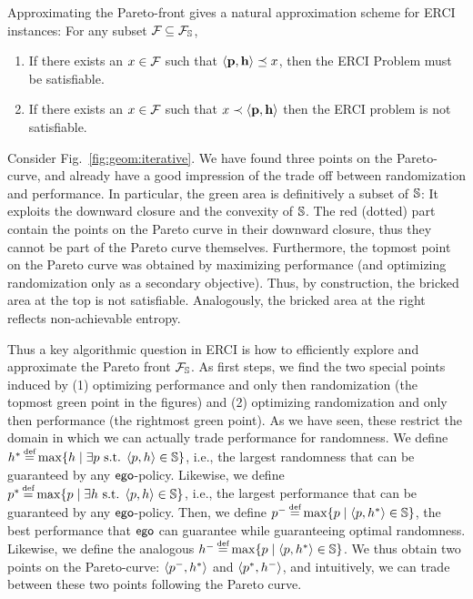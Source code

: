 \noindent
Approximating the Pareto-front gives a natural approximation
scheme for ERCI instances: For any subset $\mathcal{F}_{} \subseteq
\mathcal{F}_{\mathbb{S}}$,
\begin{enumerate}
\item If there exists an $x \in \mathcal{F}_{}$ such that
$\langle \mathbf{p}, \mathbf{h} \rangle \preceq x$, then the ERCI
Problem must be satisfiable.
\item If there exists an $x \in \mathcal{F}_{}$
such that $x \prec \langle \mathbf{p}, \mathbf{h} \rangle$ then the
ERCI problem is not satisfiable.
\end{enumerate}

\begin{example}
\label{ex:approximation}
	Consider Fig.~\ref{fig:geom:iterative}. We have found three points on the Pareto-curve, and already have a good impression of the trade off between randomization and performance. In particular, the green area is definitively a subset of $\mathbb{S}$: It exploits the downward closure and the convexity of $\mathbb{S}$. The red (dotted) part contain the points on the Pareto curve in their downward closure, thus they cannot be part of the Pareto curve themselves.
	Furthermore, the topmost point on the Pareto curve was obtained by maximizing performance (and optimizing randomization only as a secondary objective). Thus, by construction, the bricked area at the top is not satisfiable. Analogously, the bricked area at the right reflects non-achievable entropy. 
\end{example}

Thus a key algorithmic question in ERCI is how to efficiently explore
and approximate the Pareto front $\mathcal{F}_{\mathbb{S}}$. As first steps, we find the two special points induced by (1) optimizing performance and only then randomization (the topmost green point in the figures) and (2) optimizing randomization and only then performance (the rightmost green point). 
As we have seen, these restrict the domain in which we can actually trade performance for randomness. 
We define 
$\rndopt \eqdef \max \{ \rndp \mid \exists \scp \text{ s.t. } \langle \scp, \rndp \rangle \in \solutions  \} $, i.e., the largest randomness that can be guaranteed by any $\mathsf{ego}$-policy. 
Likewise, we define 
$\scopt \eqdef \max \{ \scp \mid \exists \rndp \text{ s.t. } \langle \scp, \rndp \rangle \in \solutions  \} $, i.e., the largest performance that can be guaranteed by any $\mathsf{ego}$-policy. 
Then, we define 
$\scmin \eqdef \max \{ \scp \mid \langle \scp, \rndopt \rangle  \in \solutions \}$, the best performance that $\mathsf{ego}$ can guarantee while guaranteeing optimal randomness. 
Likewise, we define  the analogous $\rndmin \eqdef \max \{ \scp \mid \langle \scp, \rndopt \rangle  \in \solutions \}$.
We thus obtain two points on the Pareto-curve: $\langle p^{-}, h^{*} \rangle$ and $\langle p^{*}, h^{-} \rangle$, and intuitively, we can trade between these two points following the Pareto curve.

